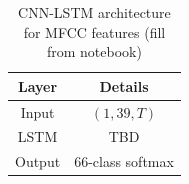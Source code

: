 
\begin{table}[!t]
    \centering
    \caption{CNN-LSTM architecture for MFCC features (fill from notebook)}
    \scriptsize
    \begin{tabular}{|c|c|}
    \hline
    Layer & Details \\ \hline
    Input & $(1, 39, T)$ \\ \hline
    LSTM & TBD \\ \hline
    Output & 66-class softmax \\ \hline
    \end{tabular}
    \label{table:cnn_lstm}
\end{table}
